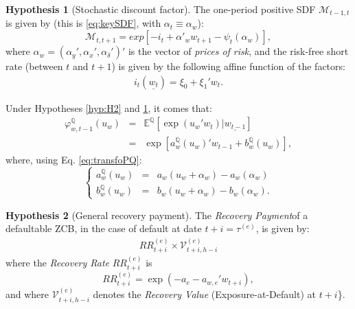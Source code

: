 \documentclass[
  12pt,
]{book}
\theoremstyle{definition}
\theoremstyle{definition}
\theoremstyle{definition}
\theoremstyle{definition}
\newtheorem{hypothesis}{Hypothesis}[chapter]
\theoremstyle{remark}
\begin{document}
\begin{hypothesis}[Stochastic discount factor]
\protect\hypertarget{hyp:H4}{}\label{hyp:H4}The one-period positive SDF \(\mathcal{M}_{t-1, t}\) is given by (this is \eqref{eq:keySDF}, with \(\alpha_t \equiv \alpha_w\)):
\begin{equation}
\mathcal{M}_{t,t+1} = exp[-i_{t}+\alpha'_w w_{t+1}-\psi_t(\alpha_w)],
\end{equation}
where \(\alpha_w = (\alpha_y ' , \alpha_x ' , \alpha_{\delta} ') '\) is the vector of \emph{prices of risk}, and the risk-free short rate (between \(t\) and \(t+1\)) is given by the following affine function of the factors:
\begin{equation}
\begin{array}{lll}
i_{t}(\underline{w_{t}}) = \xi_0 + \xi_1 ' w_{t}.
\end{array}\label{eq:shortrate}
\end{equation}
\end{hypothesis}

Under Hypotheses \ref{hyp:H2} and \ref{hyp:H4}, it comes that:
\begin{eqnarray}
\varphi^{\mathbb{Q}}_{w, t-1} (u_w) &=& \mathbb{E}^{\mathbb{Q}} \left[\exp( u_w ' w_t )   |   \underline{w_{t-1}} \right] \nonumber \\
&=& \exp \left[ a^{\mathbb{Q}}_{w} (u_{w}) ' w_{t-1} + b^{\mathbb{Q}}_{w} (u_{w}) \right],\label{eq:affineQcLT}
\end{eqnarray}
where, using Eq. \eqref{eq:transfoPQ}:
\begin{equation}
\left\{
\begin{array}{ccl}
a^{\mathbb{Q}}_{w} (u_{w}) &=& a_{w} (u_{w} + \alpha_w) - a_{w} (\alpha_w) \\
b^{\mathbb{Q}}_{w} (u_{w}) &=& b_{w} (u_{w} + \alpha_w) - b_{w} (\alpha_w).
\end{array}
\right.\label{eq:aQbQ}
\end{equation}

\begin{hypothesis}[General recovery payment]
\protect\hypertarget{hyp:RRvalue}{}\label{hyp:RRvalue}The \emph{Recovery Payment}of a defaultable ZCB, in the case of default at date \(t+i = \tau^{(e)}\), is given by:
\begin{equation}
\begin{array}{lll}
RR^{(e)}_{t+i}   \times   \mathcal{V}^{(e)}_{t+i, h-i}
\end{array}\label{eq:recoverypaym}
\end{equation}
where the \emph{Recovery Rate} \(RR^{(e)}_{t+i}\) is
\begin{equation}
RR^{(e)}_{t+i} = \exp \left( - a_{e} - a_{w, e} '   w_{t+i} \right),\label{eq:recoveryrate2}
\end{equation}
and where \(\mathcal{V}^{(e)}_{t+i, h-i}\) denotes the \emph{Recovery Value} (Exposure-at-Default) at \(t+i\)\}.
\end{hypothesis}
\end{document}

